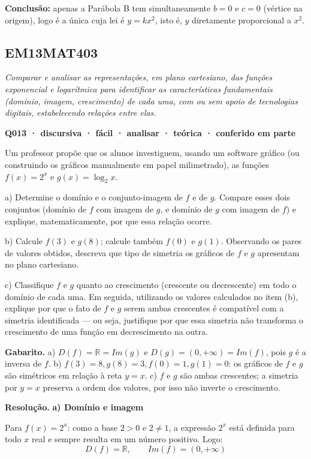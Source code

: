 \documentclass[11pt,a4paper]{article}
\begin{document}
\textbf{Conclusão:} apenas a Parábola B tem simultaneamente $b=0$ e $c=0$ (vértice na origem), logo é a única cuja lei é $y=kx^2$, isto é, $y$ diretamente proporcional a $x^2$.
\subsection*{EM13MAT403}
{\small\itshape Comparar e analisar as representações, em plano cartesiano, das funções exponencial e logarítmica para identificar as características fundamentais (domínio, imagem, crescimento) de cada uma, com ou sem apoio de tecnologias digitais, estabelecendo relações entre elas.}

\bigskip\noindent\textbf{Q013 · discursiva · fácil · analisar · teórica · conferido em parte}\par\nopagebreak
Um professor propõe que os alunos investiguem, usando um software gráfico (ou construindo os gráficos manualmente em papel milimetrado), as funções $f(x) = 2^x$ e $g(x) = \log_2 x$.

a) Determine o domínio e o conjunto-imagem de $f$ e de $g$. Compare esses dois conjuntos (domínio de $f$ com imagem de $g$, e domínio de $g$ com imagem de $f$) e explique, matematicamente, por que essa relação ocorre.

b) Calcule $f(3)$ e $g(8)$; calcule também $f(0)$ e $g(1)$. Observando os pares de valores obtidos, descreva que tipo de simetria os gráficos de $f$ e $g$ apresentam no plano cartesiano.

c) Classifique $f$ e $g$ quanto ao crescimento (crescente ou decrescente) em todo o domínio de cada uma. Em seguida, utilizando os valores calculados no item (b), explique por que o fato de $f$ e $g$ serem ambas crescentes é compatível com a simetria identificada — ou seja, justifique por que essa simetria não transforma o crescimento de uma função em decrescimento na outra.

\textbf{Gabarito.} a) $D(f)=\mathbb{R}=Im(g)$ e $D(g)=(0,+\infty)=Im(f)$, pois $g$ é a inversa de $f$. b) $f(3)=8, g(8)=3, f(0)=1, g(1)=0$: os gráficos de $f$ e $g$ são simétricos em relação à reta $y=x$. c) $f$ e $g$ são ambas crescentes; a simetria por $y=x$ preserva a ordem dos valores, por isso não inverte o crescimento.

\textbf{Resolução.} \textbf{a) Domínio e imagem}

Para $f(x) = 2^x$: como a base $2>0$ e $2 \neq 1$, a expressão $2^x$ está definida para todo $x$ real e sempre resulta em um número positivo. Logo:
$$D(f) = \mathbb{R}, \qquad Im(f) = (0, +\infty)$$
\end{document}
